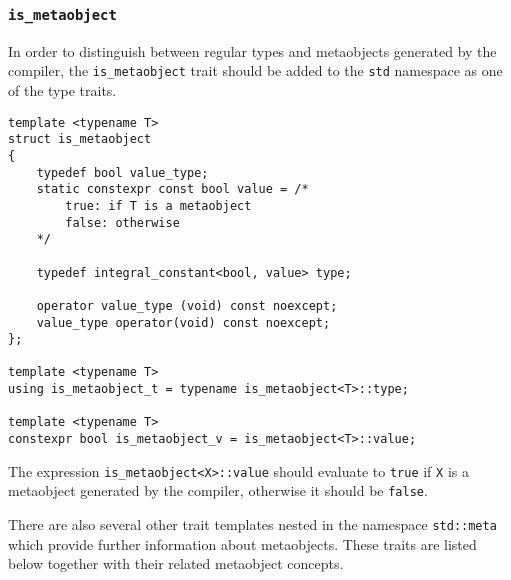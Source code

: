\subsubsection{\texttt{is\_metaobject}}

In order to distinguish between regular types and metaobjects generated
by the compiler, the \texttt{is\_metaobject} trait should be added
to the \texttt{std} namespace as one of the type traits. 

\begin{verbatim}
template <typename T>
struct is_metaobject
{
	typedef bool value_type;
	static constexpr const bool value = /*
		true: if T is a metaobject
		false: otherwise
	*/

	typedef integral_constant<bool, value> type;

	operator value_type (void) const noexcept;
	value_type operator(void) const noexcept;
};

template <typename T>
using is_metaobject_t = typename is_metaobject<T>::type;

template <typename T>
constexpr bool is_metaobject_v = is_metaobject<T>::value;
\end{verbatim}

The expression \texttt{is\_metaobject<X>::value} should evaluate to \texttt{true}
if \texttt{X} is a metaobject generated by the compiler, otherwise it should
be \texttt{false}.

There are also several other trait templates nested in the namespace
\texttt{std::meta} which provide further information about metaobjects.
These traits are listed below together with their related metaobject concepts.
